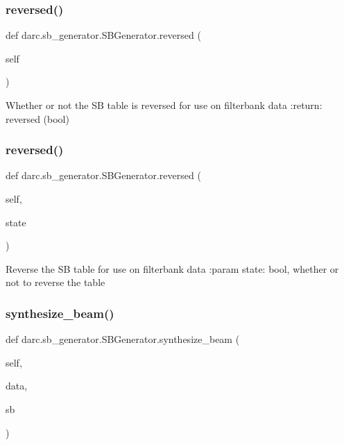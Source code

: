 \subsubsection{\texorpdfstring{reversed()}{reversed()}\hspace{0.1cm}{\footnotesize\ttfamily [1/2]}}
{\footnotesize\ttfamily def darc.\+sb\+\_\+generator.\+S\+B\+Generator.\+reversed (\begin{DoxyParamCaption}\item[{}]{self }\end{DoxyParamCaption})}

\begin{DoxyVerb}Whether or not the SB table is reversed for use on filterbank data
:return: reversed (bool)
\end{DoxyVerb}
 \mbox{\label{classdarc_1_1sb__generator_1_1_s_b_generator_a5d4732f17f1554641731037837b83bd3}} 
\subsubsection{\texorpdfstring{reversed()}{reversed()}\hspace{0.1cm}{\footnotesize\ttfamily [2/2]}}
{\footnotesize\ttfamily def darc.\+sb\+\_\+generator.\+S\+B\+Generator.\+reversed (\begin{DoxyParamCaption}\item[{}]{self,  }\item[{}]{state }\end{DoxyParamCaption})}

\begin{DoxyVerb}Reverse the SB table for use on filterbank data
:param state: bool, whether or not to reverse the table
\end{DoxyVerb}
 \mbox{\label{classdarc_1_1sb__generator_1_1_s_b_generator_a57e1d0271123a9594396edf9671bba4d}} 
\subsubsection{\texorpdfstring{synthesize\_beam()}{synthesize\_beam()}}
{\footnotesize\ttfamily def darc.\+sb\+\_\+generator.\+S\+B\+Generator.\+synthesize\+\_\+beam (\begin{DoxyParamCaption}\item[{}]{self,  }\item[{}]{data,  }\item[{}]{sb }\end{DoxyParamCaption})}

